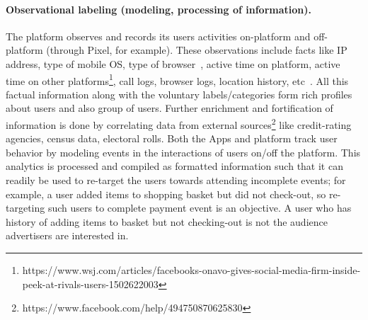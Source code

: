 \documentclass[runningheads]{llncs}
\begin{document}
\paragraph{Observational labeling (modeling, processing of information).}
The platform observes and records its users activities on-platform and
off-platform (through Pixel, for example). These observations include
facts like IP address, type of mobile OS, type of
browser~\cite{fb-browser-extension-detection}, active time on
platform, active time on other
platforms\footnote{https://www.wsj.com/articles/facebooks-onavo-gives-social-media-firm-inside-peek-at-rivals-users-1502622003},
call logs, browser logs, location history,
etc~\cite{big-brother-watching}. All this factual information along
with the voluntary labels/categories form rich profiles about users
and also group of users. Further enrichment and fortification of
information is done by correlating data from external
sources\footnote{https://www.facebook.com/help/494750870625830} like
credit-rating agencies, census data, electoral rolls. Both the Apps
and platform track user behavior by modeling events in the
interactions of users on/off the platform. This analytics is processed
and compiled as formatted information such that it can readily be used
to re-target the users towards attending incomplete events; for
example, a user added items to shopping basket but did not check-out,
so re-targeting such users to complete payment event is an objective. A
user who has history of adding items to basket but not checking-out is
not the audience advertisers are interested in.

\end{document}
